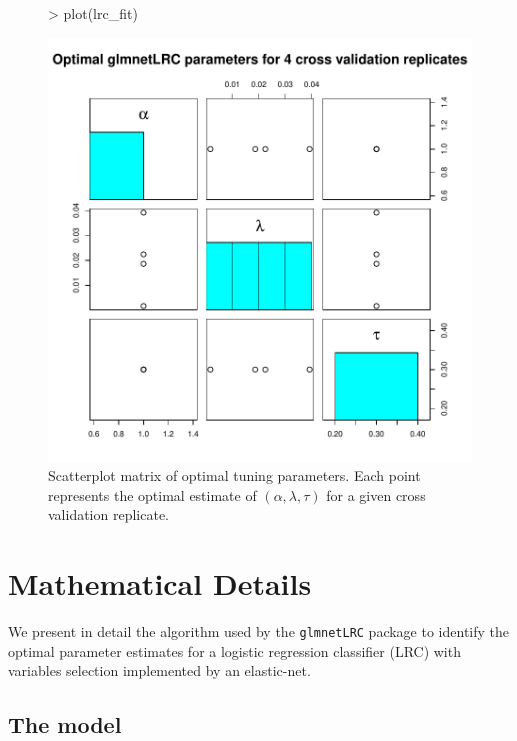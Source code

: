 \documentclass{article}
\begin{document}
\begin{figure}[H]
\begin{center}
\begin{Schunk}
\begin{Sinput}
> plot(lrc_fit)
\end{Sinput}
\end{Schunk}
\includegraphics{glmnetLRC-plot}
\caption{Scatterplot matrix of optimal tuning parameters.  Each point represents the optimal estimate of $(\alpha,\lambda,\tau)$
for a given cross validation replicate.}
\end{center}
\end{figure}

\section{Mathematical Details}
We present in detail the algorithm used by the {\tt glmnetLRC} package to identify the optimal parameter estimates
for a logistic regression classifier (LRC) with variables selection implemented by an elastic-net.  

\subsection{The model}
\end{document}

